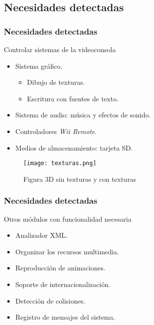 \subsection{Necesidades detectadas}

\begin{frame}	
\frametitle{Necesidades detectadas}
	\begin{block}{Controlar sistemas de la videoconsola}
		\begin{itemize}
			\item Sistema gráfico.
			\begin{itemize}
				\item Dibujo de texturas.
				\item Escritura con fuentes de texto.
			\end{itemize}
			\item Sistema de audio: música y efectos de sonido.
			\item Controladores \textit{Wii Remote}.
			\item Medios de almacenamiento: tarjeta SD.
		\end{itemize}
	\end{block}
	\begin{figure}[H]
		\label{texturas}
		\begin{center}
		\texttt{[image: texturas.png]}
		\end{center}
		\caption{Figura 3D sin texturas y con texturas}
	\end{figure}
\end{frame}

\begin{frame}	
\frametitle{Necesidades detectadas}
	\begin{block}{Otros módulos con funcionalidad necesaria}
		\begin{itemize}
			\item Analizador XML.
			\item Organizar los recursos multimedia.
			\item Reproducción de animaciones.
			\item Soporte de internacionalización.
			\item Detección de colisiones.
			\item Registro de mensajes del sistema.
		\end{itemize}
	\end{block}
\end{frame}

